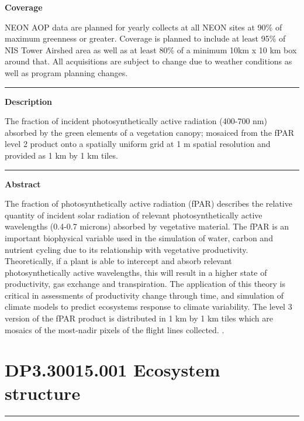 \documentclass[]{article}
\begin{document}
\textbf{Coverage}

NEON AOP data are planned for yearly collects at all NEON sites at 90\%
of maximum greenness or greater. Coverage is planned to include at least
95\% of NIS Tower Airshed area as well as at least 80\% of a minimum
10km x 10 km box around that. All acquisitions are subject to change due
to weather conditions as well as program planning changes.

\begin{center}\rule{0.5\linewidth}{\linethickness}\end{center}

\textbf{Description}

The fraction of incident photosynthetically active radiation (400-700
nm) absorbed by the green elements of a vegetation canopy; mosaiced from
the fPAR level 2 product onto a spatially uniform grid at 1 m spatial
resolution and provided as 1 km by 1 km tiles.

\begin{center}\rule{0.5\linewidth}{\linethickness}\end{center}

\textbf{Abstract}

The fraction of photosynthetically active radiation (fPAR) describes the
relative quantity of incident solar radiation of relevant
photosynthetically active wavelengths (0.4-0.7 microns) absorbed by
vegetative material. The fPAR is an important biophysical variable used
in the simulation of water, carbon and nutrient cycling due to its
relationship with vegetative productivity. Theoretically, if a plant is
able to intercept and absorb relevant photosynthetically active
wavelengths, this will result in a higher state of productivity, gas
exchange and transpiration. The application of this theory is critical
in assessments of productivity change through time, and simulation of
climate models to predict ecosystems response to climate variability.
The level 3 version of the fPAR product is distributed in 1 km by 1 km
tiles which are mosaics of the most-nadir pixels of the flight lines
collected. \newpage
.

\section{DP3.30015.001 Ecosystem
structure}\label{dp3.30015.001-ecosystem-structure}

\begin{center}\rule{0.5\linewidth}{\linethickness}\end{center}
\end{document}
